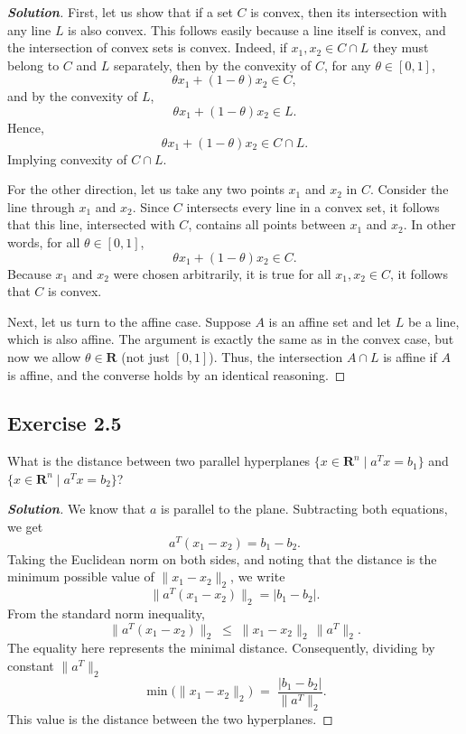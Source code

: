 \documentclass[12pt]{article}
\newenvironment{Solution}
  {\begin{proof}[\textbf{Solution}]}
  {\end{proof}}
\begin{document}
\begin{Solution}
	First, let us show that if a set \(C\) is convex, then its intersection with any line \(L\) is also convex.
	This follows easily because a line itself is convex, and the intersection of convex sets is convex.
	Indeed, if \(x_1, x_2 \in C \cap L\) they must belong to \(C\) and \(L\) separately, then by the convexity of \(C\), for any \(\theta \in [0,1]\),
	\[
		\theta x_1 + (1 - \theta) x_2 \in C,
	\]
	and by the convexity of \(L\),
	\[
		\theta x_1 + (1 - \theta) x_2 \in L.
	\]
	Hence,
	\[
		\theta x_1 + (1 - \theta) x_2 \in C \cap L.
	\]
	Implying convexity of $C \cap L$.

	For the other direction, let us take any two points \(x_1\) and \(x_2\) in \(C\).
	Consider the line through \(x_1\) and \(x_2\).
	Since \(C\) intersects every line in a convex set, it follows that this line, intersected with \(C\), contains all points between \(x_1\) and \(x_2\).
	In other words, for all \(\theta \in [0,1]\),
	\[
		\theta x_1 + (1 - \theta) x_2 \in C.
	\]
	Because \(x_1\) and \(x_2\) were chosen arbitrarily, it is true for all $x_1, x_2 \in C$, it follows that \(C\) is convex.

	Next, let us turn to the affine case.
	Suppose \(A\) is an affine set and let \(L\) be a line, which is also affine.
	The argument is exactly the same as in the convex case, but now we allow \(\theta \in \mathbf{R}\) (not just \([0,1]\)).
	Thus, the intersection \(A \cap L\) is affine if \(A\) is affine, and the converse holds by an identical reasoning.
\end{Solution}


\vspace{0.15in}

\subsection*{Exercise 2.5}
What is the distance between two parallel hyperplanes
\(\{x \in \mathbf{R}^n \mid a^T x = b_1\}\)
and
\(\{x \in \mathbf{R}^n \mid a^T x = b_2\}\)?

\begin{Solution}
	We know that \(a\) is parallel to the plane. Subtracting both equations, we get
	\[
		a^T (x_1 - x_2) = b_1 - b_2.
	\]
	Taking the Euclidean norm on both sides, and noting that the distance is the minimum possible value of \(\|x_1 - x_2\|_2\), we write
	\[
		\|a^T (x_1 - x_2)\|_2 = |b_1 - b_2|.
	\]
	From the standard norm inequality,
	\[
		\|a^T (x_1 - x_2)\|_2
		\;\le\;
		\|x_1 - x_2\|_2 \,\|a^T\|_2.
	\]
	The equality here represents the minimal distance. Consequently, dividing by constant \(\|a^T\|_2\)
	\[
		\min\bigl(\|x_1 - x_2\|_2\bigr)
		\;=\;
		\frac{|b_1 - b_2|}{\|a^T\|_2}.
	\]
	This value is the distance between the two hyperplanes.
\end{Solution}
\end{document}
